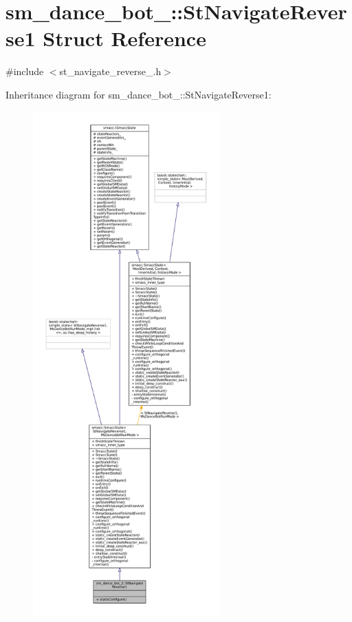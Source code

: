 \hypertarget{structsm__dance__bot__2_1_1StNavigateReverse1}{}\section{sm\+\_\+dance\+\_\+bot\+\_\+:\+:St\+Navigate\+Reverse1 Struct Reference}
\label{structsm__dance__bot__2_1_1StNavigateReverse1}


{\ttfamily \#include $<$st\+\_\+navigate\+\_\+reverse\+\_.\+h$>$}



Inheritance diagram for sm\+\_\+dance\+\_\+bot\+\_\+:\+:St\+Navigate\+Reverse1\+:
\nopagebreak
\begin{figure}[H]
\begin{center}
\leavevmode
\includegraphics[height=550pt]{structsm__dance__bot__2_1_1StNavigateReverse1__inherit__graph}
\end{center}
\end{figure}


